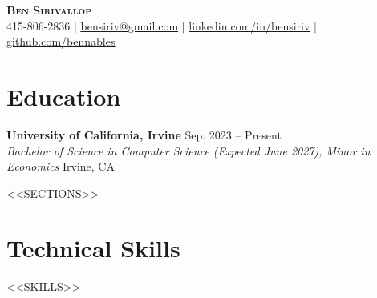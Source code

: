 \documentclass[letterpaper,11pt]{article}
\renewcommand\ULdepth{1.8pt}
\begin{document}
\renewcommand{\ULdepth}{4pt}

\begin{center}
    \textbf{\Huge \scshape Ben Sirivallop} \\ \vspace{1pt}
    \small 415-806-2836 $|$ \href{mailto:bensiriv@gmail.}{\uline{bensiriv@gmail.com}} $|$
\href{https://linkedin.com/in/bensiriv}{\uline{linkedin.com/in/bensiriv}} $|$
\href{https://github.com/bennables}{\uline{github.com/bennables}}
\end{center}

\section*{Education}
\textbf{University of California, Irvine} \hfill Sep. 2023 -- Present \\
\textit{Bachelor of Science in Computer Science (Expected June 2027), Minor in Economics} \hfill Irvine, CA

<<SECTIONS>>

\section*{Technical Skills}
\begingroup
\small
<<SKILLS>>
\endgroup
\end{document}
